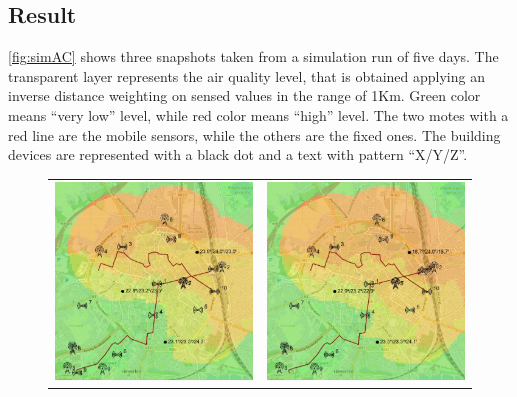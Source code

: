 \subsection{Result}
\autoref{fig:simAC} shows three snapshots taken from a simulation run of five days.
The transparent layer represents the air quality level, that is obtained applying an inverse distance weighting on sensed values in the range of 1Km. 
Green color means ``very low'' level, while red color means ``high'' level.
The two motes with a red line are the mobile sensors, while the others are the fixed ones.
The building devices are represented with a black dot and a text with pattern ``X/Y/Z''.
% 
\begin{figure}[h]
    \centering
    \begin{tabular}{ll}
         \includegraphics[scale=0.42]{figures/simACsnap1s.png}  &
         \includegraphics[scale=0.42]{figures/simACsnap2s.png}

\end{tabular}
\end{figure}
